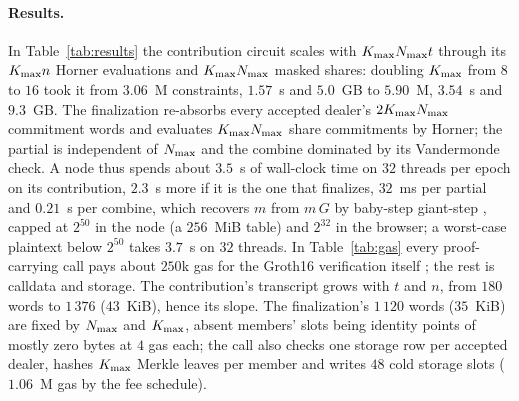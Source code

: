 \paragraph{Results.} In Table~\ref{tab:results} the contribution circuit scales with $K_{\max}N_{\max} t$ through its $K_{\max} n$ Horner evaluations and $K_{\max}N_{\max}$ masked shares: doubling $K_{\max}$ from $8$ to $16$ took it from $3.06$~M constraints, $1.57$~s and $5.0$~GB to $5.90$~M, $3.54$~s and $9.3$~GB. The finalization re-absorbs every accepted dealer's $2K_{\max}N_{\max}$ commitment words and evaluates $K_{\max}N_{\max}$ share commitments by Horner; the partial is independent of $N_{\max}$ and the combine dominated by its Vandermonde check. A node thus spends about $3.5$~s of wall-clock time on $32$ threads per epoch on its contribution, $2.3$~s more if it is the one that finalizes, $32$~ms per partial and $0.21$~s per combine, which recovers $m$ from $m\,G$ by baby-step giant-step \cite{shanks1971class}, capped at $2^{50}$ in the node (a $256$~MiB table) and $2^{32}$ in the browser; a worst-case plaintext below $2^{50}$ takes $3.7$~s on $32$ threads. In Table~\ref{tab:gas} every proof-carrying call pays about $250$k gas for the Groth16 verification itself \cite{eip1108}; the rest is calldata and storage. The contribution's transcript grows with $t$ and $n$, from $180$ words to $1\,376$ ($43$~KiB), hence its slope. The finalization's $1\,120$ words ($35$~KiB) are fixed by $N_{\max}$ and $K_{\max}$, absent members' slots being identity points of mostly zero bytes at $4$ gas each; the call also checks one storage row per accepted dealer, hashes $K_{\max}$ Merkle leaves per member and writes $48$ cold storage slots ($1.06$~M gas by the fee schedule).

